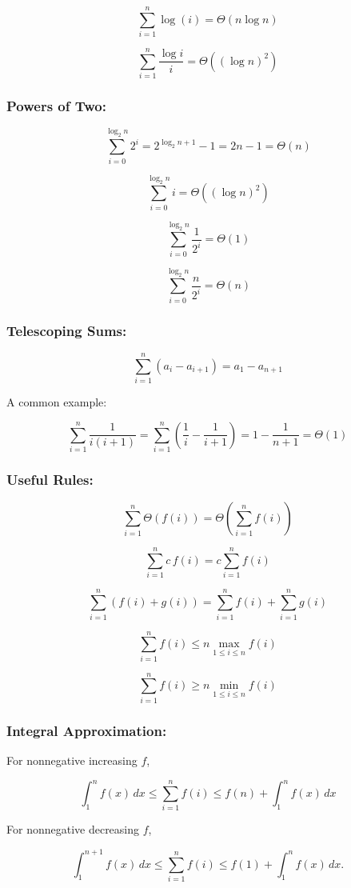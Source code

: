 \documentclass[11pt]{article}
\begin{document}
\[
\sum_{i=1}^{n}\log(i)
=
\Theta(n\log n)
\]

\[
\sum_{i=1}^{n}\frac{\log i}{i}
=
\Theta((\log n)^2)
\]


\subsubsection{Powers of Two:}

\[
\sum_{i=0}^{\log_2 n} 2^i
=
2^{\log_2 n+1}-1
=
2n-1
=
\Theta(n)
\]

\[
\sum_{i=0}^{\log_2 n} i
=
\Theta((\log n)^2)
\]

\[
\sum_{i=0}^{\log_2 n} \frac{1}{2^i}
=
\Theta(1)
\]

\[
\sum_{i=0}^{\log_2 n} \frac{n}{2^i}
=
\Theta(n)
\]


\subsubsection{Telescoping Sums:}

\[
\sum_{i=1}^{n}(a_i-a_{i+1})
=
a_1-a_{n+1}
\]

A common example:

\[
\sum_{i=1}^{n}\frac{1}{i(i+1)}
=
\sum_{i=1}^{n}
\left(\frac1i-\frac1{i+1}\right)
=
1-\frac1{n+1}
=
\Theta(1)
\]


\subsubsection{Useful Rules:}

\[
\sum_{i=1}^{n}\Theta(f(i))
=
\Theta\left(\sum_{i=1}^{n}f(i)\right)
\]

\[
\sum_{i=1}^{n}c\,f(i)
=
c\sum_{i=1}^{n}f(i)
\]

\[
\sum_{i=1}^{n}(f(i)+g(i))
=
\sum_{i=1}^{n}f(i)
+
\sum_{i=1}^{n}g(i)
\]

\[
\sum_{i=1}^{n} f(i)
\leq
n\max_{1\leq i\leq n} f(i)
\]

\[
\sum_{i=1}^{n} f(i)
\geq
n\min_{1\leq i\leq n} f(i)
\]


\subsubsection{Integral Approximation:}

For nonnegative increasing $f$,

\[
\int_1^n f(x)\,dx
\leq
\sum_{i=1}^{n}f(i)
\leq
f(n)+\int_1^n f(x)\,dx
\]

For nonnegative decreasing $f$,

\[
\int_1^{n+1} f(x)\,dx
\leq
\sum_{i=1}^{n}f(i)
\leq
f(1)+\int_1^n f(x)\,dx.
\]
\end{document}
